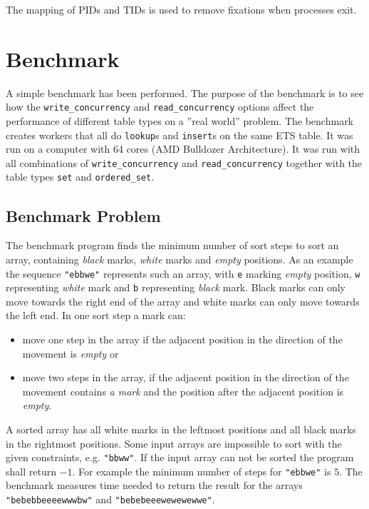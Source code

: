 \documentclass[aps,pre,preprint,nofootinbib]{revtex4}
\begin{document}
The mapping of PIDs and TIDs is used to remove fixations when processes exit.

\section{Benchmark} \label{sec:benchmark}

  A simple benchmark has been performed.
  The purpose of the benchmark is to see how the \verb|write_concurrency| and \verb|read_concurrency| options affect the performance of different table types on a ''real world'' problem.
  The benchmark creates workers that all do \verb|lookup|s and \verb|insert|s on the same ETS table.
  It was run on a computer with 64 cores (AMD Bulldozer Architecture).
  It was run with all combinations of \verb|write_concurrency| and \verb|read_concurrency| together with the table types \verb|set| and \verb|ordered_set|.

  \subsection{Benchmark Problem}
    The benchmark program finds the minimum number of sort steps to sort an array, containing \emph{black} marks, \emph{white} marks and \emph{empty} positions.
    As an example the sequence \verb|"ebbwe"| represents such an array, with \verb|e| marking \emph{empty} position, \verb|w| representing \emph{white} mark and \verb|b| representing \emph{black} mark.
    Black marks can only move towards the right end of the array and white marks can only move towards the left end.
    In one sort step a mark can:
    \begin{itemize}
     \item move one step in the array if the adjacent position in the direction of the movement is \emph{empty} or
     \item move two steps in the array, if the adjacent position in the direction of the movement contains \emph{a mark} and the position after the adjacent position is \emph{empty}.
    \end{itemize}
    A sorted array has all white marks in the leftmost positions and all black marks in the rightmost positions.
    Some input arrays are impossible to sort with the given constraints, e.g. \verb|"bbww"|.
    If the input array can not be sorted the program shall return $-1$.
    For example the minimum number of steps for \verb|"ebbwe"| is $5$.
    The benchmark measures time needed to return the result for the arrays \verb|"bebebbeeeewwwbw"| and \verb|"bebebeeewewewewwe"|.
\end{document}
